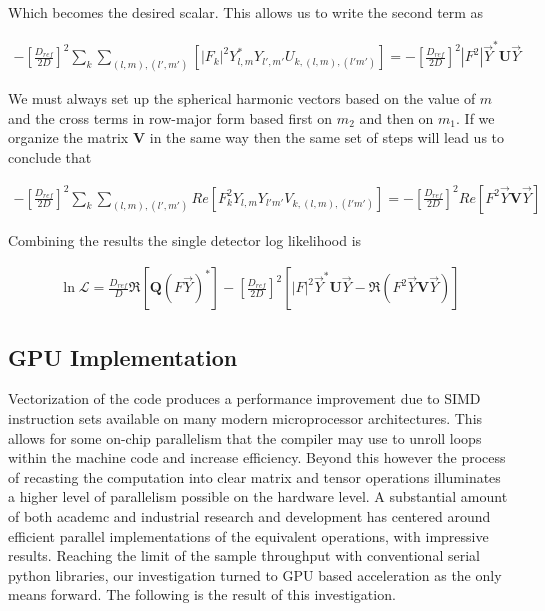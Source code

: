 \documentclass[paper=a4, fontsize=11pt]{scrartcl} %
\numberwithin{equation}{section} %
\numberwithin{figure}{section} %
\numberwithin{table}{section} %
\begin{document}
Which becomes the desired scalar. This allows us to write the second term as

\begin{align}
- \left[\frac{D_{ref}}{2D}\right]^{2}\sum_{k}\sum_{(l,m),(l',m')}\left[|F_k|^2 Y_{l,m}^{*}Y_{l',m'}U_{k,(l,m),(l'm')}\right] =  - \left[\frac{D_{ref}}{2D}\right]^{2} |F^2|\vec{Y}^{*}\mathbf{U}\vec{Y}
\end{align}

We must always set up the spherical harmonic vectors based on the value of $m$ and the cross terms in row-major form based first on $m_2$ and then on $m_1$. If we organize the matrix $\mathbf{V}$ in the same way then the same set of steps will lead us to conclude that  


\begin{align}
- \left[\frac{D_{ref}}{2D}\right]^{2}\sum_{k}\sum_{(l,m),(l',m')}Re\left[  F_{k}^{2}Y_{l,m}Y_{l'm'}V_{k,(l,m),(l'm')}\right] = - \left[\frac{D_{ref}}{2D}\right]^{2}Re \left[F^2 \vec{Y}\mathbf{V}\vec{Y} \right]
\end{align}

Combining the results the single detector log likelihood is 

\begin{align}
\ln{\mathcal{L}} = \frac{D_{ref}}{D}\Re\left[\mathbf{Q}\left(F\vec{Y}\right)^{*}\right] - \left[\frac{D_{ref}}{2D}\right]^{2}\left[|F|^2 \vec{Y}^{*}\mathbf{U}\vec{Y} - \Re\left(F^2 \vec{Y}\mathbf{V}\vec{Y}\right) \right]
\end{align}

\subsection{GPU Implementation}
Vectorization of the code produces a performance improvement due to SIMD instruction sets available on many modern microprocessor architectures. This allows for some on-chip parallelism that the compiler may use to unroll loops within the machine code and increase efficiency. Beyond this however the process of recasting the computation into clear matrix and tensor operations illuminates a higher level of parallelism possible on the hardware level. A substantial amount of both academc and industrial research and development has centered around efficient parallel implementations of the equivalent operations, with impressive results. Reaching the limit of the sample throughput with conventional serial python libraries, our investigation turned to GPU based acceleration as the only means forward. The following is the result of this investigation.
\end{document}
